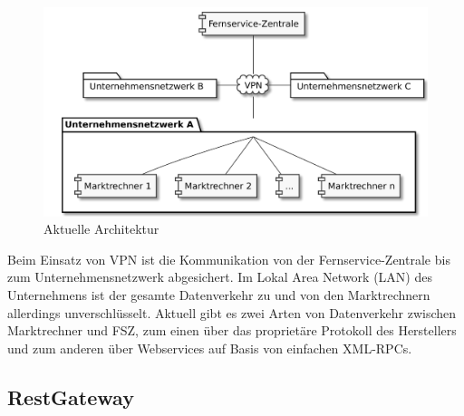 \documentclass[11pt,a4paper]{report}
\begin{document}

\begin{figure}[htbp]
\centering
\includegraphics[scale=0.19]{images/problemfeld.pdf}
\caption{Aktuelle Architektur}
\label{fig:current_setup}
\end{figure}

Beim Einsatz von VPN ist die Kommunikation von der Fernservice-Zentrale bis zum Unternehmensnetzwerk abgesichert. Im Lokal Area Network (LAN) des Unternehmens ist der gesamte Datenverkehr zu und von den Marktrechnern allerdings unverschlüsselt. Aktuell gibt es zwei Arten von Datenverkehr zwischen Marktrechner und FSZ, zum einen über das proprietäre Protokoll des Herstellers und zum anderen über Webservices auf Basis von einfachen XML-RPCs.

\subsection{RestGateway} 
\end{document}

